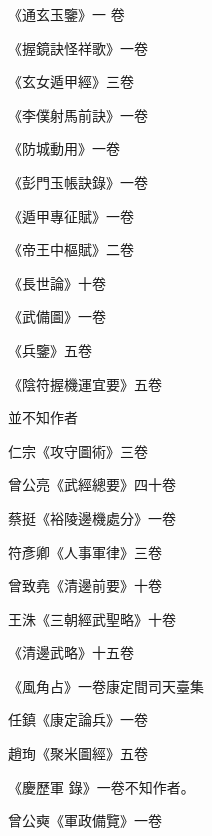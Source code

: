 \begin{pinyinscope}
 《通玄玉鑒》一
 卷



 《握鏡訣怪祥歌》一卷



 《玄女遁甲經》三卷



 《李僕射馬前訣》一卷



 《防城動用》一卷



 《彭門玉帳訣錄》一卷



 《遁甲專征賦》一卷



 《帝王中樞賦》二卷



 《長世論》十卷



 《武備圖》一卷



 《兵鑒》五卷



 《陰符握機運宜要》五卷



 並不知作者



 仁宗《攻守圖術》三卷



 曾公亮《武經總要》四十卷



 蔡挺《裕陵邊機處分》一卷



 符彥卿《人事軍律》三卷



 曾致堯《清邊前要》十卷



 王洙《三朝經武聖略》十卷



 《清邊武略》十五卷



 《風角占》一卷康定間司天臺集



 任鎮《康定論兵》一卷



 趙珣《聚米圖經》五卷



 《慶歷軍
 錄》一卷不知作者。



 曾公奭《軍政備覽》一卷




\end{pinyinscope}
